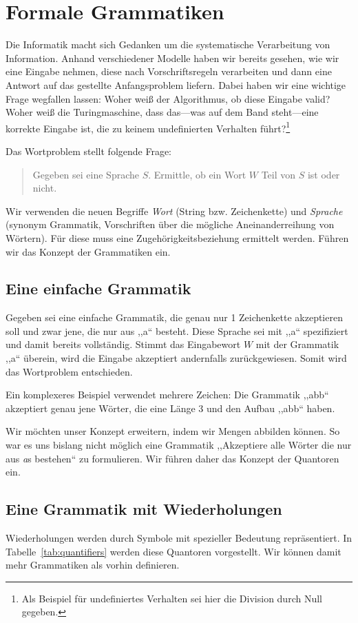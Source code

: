 \chapter{Formale Grammatiken}
%
Die Informatik macht sich Gedanken um die systematische Verarbeitung von Information. Anhand verschiedener Modelle haben wir bereits gesehen, wie wir eine Eingabe nehmen, diese nach Vorschriftsregeln verarbeiten und dann eine Antwort auf das gestellte Anfangsproblem liefern. Dabei haben wir eine wichtige Frage wegfallen lassen: Woher weiß der Algorithmus, ob diese Eingabe valid? Woher weiß die Turingmaschine, dass das---was auf dem Band steht---eine korrekte Eingabe ist, die zu keinem undefinierten Verhalten führt?\footnote{Als Beispiel für undefiniertes Verhalten sei hier die Division durch Null gegeben.}

Das Wortproblem stellt folgende Frage:
\begin{quotation}
  Gegeben sei eine Sprache $S$. Ermittle, ob ein Wort $W$ Teil von $S$ ist oder nicht.
\end{quotation}
%
Wir verwenden die neuen Begriffe \emph{Wort} (String bzw. Zeichenkette) und \emph{Sprache} (synonym Grammatik, Vorschriften über die mögliche Aneinanderreihung von Wörtern). Für diese muss eine Zugehörigkeitsbeziehung ermittelt werden. Führen wir das Konzept der Grammatiken ein.

\section{Eine einfache Grammatik}
%
Gegeben sei eine einfache Grammatik, die genau nur 1 Zeichenkette akzeptieren soll und zwar jene, die nur aus ,,a`` besteht. Diese Sprache sei mit ,,a`` spezifiziert und damit bereits vollständig. Stimmt das Eingabewort $W$ mit der Grammatik ,,a`` überein, wird die Eingabe akzeptiert andernfalls zurückgewiesen. Somit wird das Wortproblem entschieden.

Ein komplexeres Beispiel verwendet mehrere Zeichen: Die Grammatik ,,abb`` akzeptiert genau jene Wörter, die eine Länge 3 und den Aufbau ,,abb`` haben.

Wir möchten unser Konzept erweitern, indem wir Mengen abbilden können. So war es uns bislang nicht möglich eine Grammatik ,,Akzeptiere alle Wörter die nur aus \emph{a}s bestehen`` zu formulieren. Wir führen daher das Konzept der Quantoren ein.

\section{Eine Grammatik mit Wiederholungen}
%
Wiederholungen werden durch Symbole mit spezieller Bedeutung repräsentiert. In Tabelle~\ref{tab:quantifiers} werden diese Quantoren vorgestellt. Wir können damit mehr Grammatiken als vorhin definieren.

